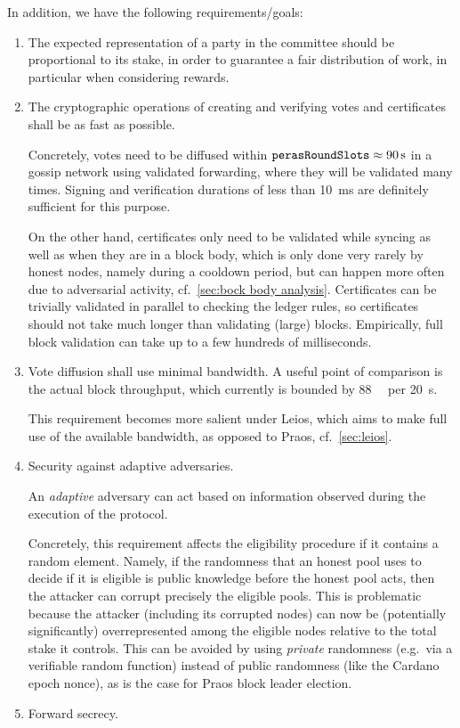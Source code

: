 In addition, we have the following requirements/goals:
\begin{enumerate}
\item\label{enumi:cert reqs fairness}
  The expected representation of a party in the committee should be proportional to its stake, in order to guarantee a fair distribution of work, in particular when considering rewards.
\item
  The cryptographic operations of creating and verifying votes and certificates shall be as fast as possible.

  Concretely, votes need to be diffused within $\perasRoundSlots \approx \qty{90}{\s}$ in a gossip network using validated forwarding, where they will be validated many times. Signing and verification durations of less than \qty{10}{\milli\s} are definitely sufficient for this purpose.

  On the other hand, certificates only need to be validated while syncing as well as when they are in a block body, which is only done very rarely by honest nodes, namely during a cooldown period, but can happen more often due to adversarial activity, cf.~\cref{sec:bock body analysis}.
  Certificates can be trivially validated in parallel to checking the ledger rules, so certificates should not take much longer than validating (large) blocks.
  Empirically, full block validation can take up to a few hundreds of milliseconds.
\item
  Vote diffusion shall use minimal bandwidth.
  A useful point of comparison is the actual block throughput, which currently is bounded by \qty{88}{\kibi\byte} per \qty{20}{\s}.

  This requirement becomes more salient under Leios, which aims to make full use of the available bandwidth, as opposed to Praos, cf.~\cref{sec:leios}.
\item
  Security against adaptive adversaries.

  An \emph{adaptive} adversary can act based on information observed during the execution of the protocol.

  Concretely, this requirement affects the eligibility procedure if it contains a random element.
  Namely, if the randomness that an honest pool uses to decide if it is eligible is public knowledge before the honest pool acts, then the attacker can corrupt precisely the eligible pools.
  This is problematic because the attacker (including its corrupted nodes) can now be (potentially significantly) overrepresented among the eligible nodes relative to the total stake it controls.
  This can be avoided by using \emph{private} randomness (e.g.\ via a verifiable random function) instead of public randomness (like the Cardano epoch nonce), as is the case for Praos block leader election.
\item
  Forward secrecy.


\end{enumerate}
